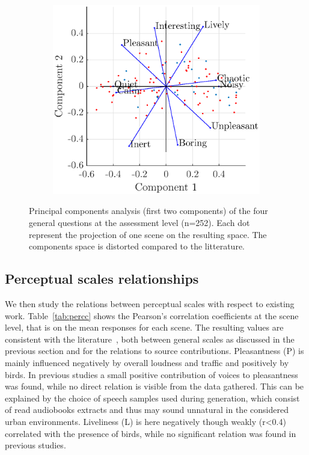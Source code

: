 \documentclass[11pt,a4paper]{article}
\begin{document}
\begin{figure}[h]
\begin{subfigure}[t]{0.5\textwidth}
        \includegraphics[width=\textwidth]{figures/pca_sim.eps}
    \end{subfigure}
    \caption{Principal components analysis (first two components) of the four general questions at the assessment level (n=252). Each dot represent the projection of one scene on the resulting space. The components space is distorted compared to the litterature.}\label{fig:pspace}
\end{figure}



\subsection{Perceptual scales relationships}
\label{sec:perc_mdls}


We then study the relations between perceptual scales with respect to existing work. Table~\ref{tab:percc} shows the Pearson's correlation coefficients at the scene level, that is on the mean responses for each scene. The resulting values are consistent with the literature~\cite{aumond2017, gontier2018}, both between general scales as discussed in the previous section and for the relations to source contributions. Pleasantness (P) is mainly influenced negatively by overall loudness and traffic and positively by birds. In previous studies a small positive contribution of voices to pleasantness was found, while no direct relation is visible from the data gathered. This can be explained by the choice of speech samples used during generation, which consist of read audiobooks extracts and thus may sound unnatural in the considered urban environments. Liveliness (L) is here negatively though weakly (r<0.4) correlated with the presence of birds, while no significant relation was found in previous studies.\\
\end{document}
